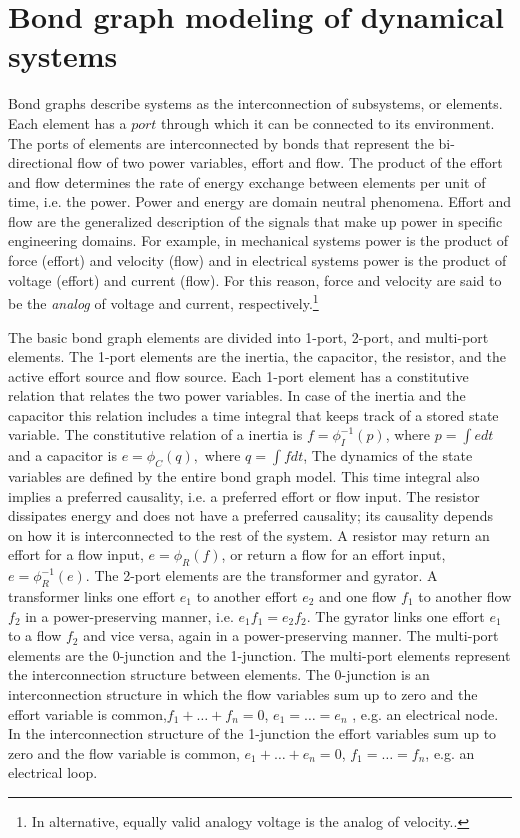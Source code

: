 \section{Bond graph modeling of dynamical systems}
Bond graphs describe systems as the interconnection of subsystems, or elements.
Each element has a $port$ through which it can be connected to its environment.
The ports of elements are interconnected by bonds that represent the bi-directional flow of two power variables, effort and flow.
The product of the effort and flow determines the rate of energy exchange between elements per unit of time, i.e. the power.
Power and energy are domain neutral phenomena.
Effort and flow are the generalized description of the signals that make up power in specific engineering domains.
For example, in mechanical systems power is the product of force (effort) and velocity (flow) and in electrical systems power is the product of voltage (effort) and current (flow).
For this reason, force and velocity are said to be the \textit{analog} of voltage and current, respectively.\footnote{In alternative, equally valid analogy voltage is the analog of velocity.\cite{}.}

The basic bond graph elements are divided into 1-port, 2-port, and multi-port elements.
The 1-port elements are the inertia, the capacitor, the resistor, and the active effort source and flow source.
Each 1-port element has a constitutive relation that relates the two power variables.
In case of the inertia and the capacitor this relation includes a time integral that keeps track of a stored state variable. 
The constitutive relation of a inertia is $f= \phi_I^{-1}(p)$, where $p=\int e dt$ and a capacitor is $e = \phi_C (q),$ where $q =\int f dt$,
The dynamics of the state variables are defined by the entire bond graph model.
This time integral also implies a preferred causality, i.e. a preferred effort or flow input.
The resistor dissipates energy and does not have a preferred causality; its causality depends on how it is interconnected to the rest of the system.
A resistor may return an effort for a flow input, $e=\phi_R(f)$, or return a flow for an effort input, $e=\phi_R^{-1}(e)$.
The 2-port elements are the transformer and gyrator.
A transformer links one effort $e_1$ to another effort $e_2$ and one flow $f_1$ to another flow $f_2$ in a power-preserving manner, i.e. $e_1f_1=e_2f_2$.
The gyrator links one effort $e_1$ to a flow $f_2$ and vice versa, again in a power-preserving manner.
The multi-port elements are the 0-junction and the 1-junction.
The multi-port elements represent the interconnection structure between elements. 
The 0-junction is an interconnection structure in which the flow variables sum up to zero and the effort variable is common,$f_1+\dots+f_n=0$, $e_1=\dots =e_n$ , e.g. an electrical node.
In the interconnection structure of the 1-junction the effort variables sum up to zero and the flow variable is common, $e_1+\dots+e_n=0$, $f_1=\dots =f_n$, e.g. an electrical loop.

